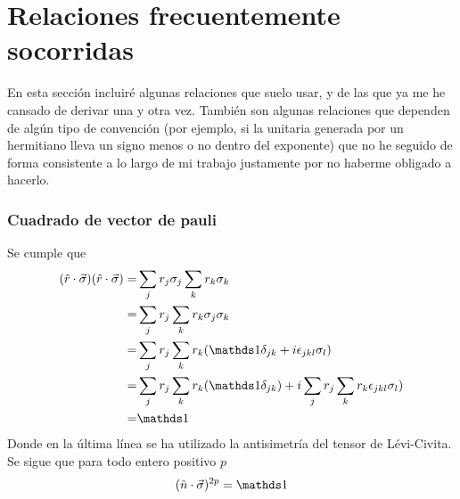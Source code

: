\section{Relaciones frecuentemente socorridas}

En esta sección incluiré algunas relaciones que suelo usar, y de las que ya me he cansado de derivar una y otra vez. También son algunas relaciones que dependen de algún tipo de convención (por ejemplo, si la unitaria generada por un hermitiano lleva un signo menos o no dentro del exponente) que no he seguido de forma consistente a lo largo de mi trabajo justamente por no haberme obligado a hacerlo.
\subsubsection{Cuadrado de vector de pauli}
Se cumple que
\begin{align*}
    (\paulivec{r})(\paulivec{r})=&\sum_{j}r_{j}\pauli{j}\sum_{k}r_{k}\pauli{k}\\
    =&\sum_{j}r_{j}\sum_{k}r_{k}\pauli{j}\pauli{k}\\
    =&\sum_{j}r_{j}\sum_{k}r_{k}(\Id\delta_{jk}+i\epsilon_{jkl}\pauli{l})\\
    =&\sum_{j}r_{j}\sum_{k}r_{k}(\Id\delta_{jk})+i\sum_{j}r_{j}\sum_{k}r_{k}\epsilon_{jkl}\pauli{l})\\
    =&\Id
\end{align*}
Donde en la última línea se ha utilizado la antisimetría del tensor de Lévi-Civita. Se sigue que para todo entero positivo $p$
\begin{equation}
    (\paulivec{n})^{2p}=\Id
\end{equation}

